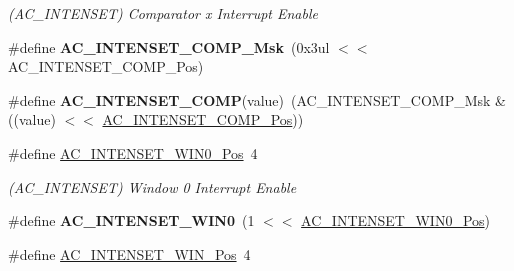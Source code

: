 \begin{DoxyCompactItemize}
\begin{DoxyCompactList}\small\item\em (A\+C\+\_\+\+I\+N\+T\+E\+N\+S\+E\+T) Comparator x Interrupt Enable \end{DoxyCompactList}\item 
\hypertarget{group___s_a_m_l21___a_c_gaa957a988d4966a19792d3474bed9a9b1}{}\#define {\bfseries A\+C\+\_\+\+I\+N\+T\+E\+N\+S\+E\+T\+\_\+\+C\+O\+M\+P\+\_\+\+Msk}~(0x3ul $<$$<$ A\+C\+\_\+\+I\+N\+T\+E\+N\+S\+E\+T\+\_\+\+C\+O\+M\+P\+\_\+\+Pos)\label{group___s_a_m_l21___a_c_gaa957a988d4966a19792d3474bed9a9b1}

\item 
\hypertarget{group___s_a_m_l21___a_c_ga5535ecfee837bd7ec53c844c00187b59}{}\#define {\bfseries A\+C\+\_\+\+I\+N\+T\+E\+N\+S\+E\+T\+\_\+\+C\+O\+M\+P}(value)~(A\+C\+\_\+\+I\+N\+T\+E\+N\+S\+E\+T\+\_\+\+C\+O\+M\+P\+\_\+\+Msk \& ((value) $<$$<$ \hyperlink{group___s_a_m_l21___a_c_ga2b61c7a2be4d8dac26ce19d694a91b60}{A\+C\+\_\+\+I\+N\+T\+E\+N\+S\+E\+T\+\_\+\+C\+O\+M\+P\+\_\+\+Pos}))\label{group___s_a_m_l21___a_c_ga5535ecfee837bd7ec53c844c00187b59}

\item 
\hypertarget{group___s_a_m_l21___a_c_gac6e5dbfd1035305c4817fa3da1f1f338}{}\#define \hyperlink{group___s_a_m_l21___a_c_gac6e5dbfd1035305c4817fa3da1f1f338}{A\+C\+\_\+\+I\+N\+T\+E\+N\+S\+E\+T\+\_\+\+W\+I\+N0\+\_\+\+Pos}~4\label{group___s_a_m_l21___a_c_gac6e5dbfd1035305c4817fa3da1f1f338}

\begin{DoxyCompactList}\small\item\em (A\+C\+\_\+\+I\+N\+T\+E\+N\+S\+E\+T) Window 0 Interrupt Enable \end{DoxyCompactList}\item 
\hypertarget{group___s_a_m_l21___a_c_gaf931cc617bcbccb3743c74cce4dd2d16}{}\#define {\bfseries A\+C\+\_\+\+I\+N\+T\+E\+N\+S\+E\+T\+\_\+\+W\+I\+N0}~(1 $<$$<$ \hyperlink{group___s_a_m_l21___a_c_gac6e5dbfd1035305c4817fa3da1f1f338}{A\+C\+\_\+\+I\+N\+T\+E\+N\+S\+E\+T\+\_\+\+W\+I\+N0\+\_\+\+Pos})\label{group___s_a_m_l21___a_c_gaf931cc617bcbccb3743c74cce4dd2d16}

\item 
\hypertarget{group___s_a_m_l21___a_c_ga4e44fa65ab29f61ec05f25c67c2f8f25}{}\#define \hyperlink{group___s_a_m_l21___a_c_ga4e44fa65ab29f61ec05f25c67c2f8f25}{A\+C\+\_\+\+I\+N\+T\+E\+N\+S\+E\+T\+\_\+\+W\+I\+N\+\_\+\+Pos}~4\label{group___s_a_m_l21___a_c_ga4e44fa65ab29f61ec05f25c67c2f8f25}


\end{DoxyCompactItemize}
